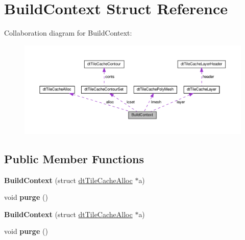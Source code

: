 \hypertarget{structBuildContext}{}\section{Build\+Context Struct Reference}
\label{structBuildContext}


Collaboration diagram for Build\+Context\+:
\nopagebreak
\begin{figure}[H]
\begin{center}
\leavevmode
\includegraphics[width=350pt]{structBuildContext__coll__graph}
\end{center}
\end{figure}
\subsection*{Public Member Functions}
\begin{DoxyCompactItemize}
\item 
\mbox{\label{structBuildContext_aa827e39c713a81b79a7c70fb600cac06}} 
{\bfseries Build\+Context} (struct \hyperlink{structdtTileCacheAlloc}{dt\+Tile\+Cache\+Alloc} $\ast$a)
\item 
\mbox{\label{structBuildContext_a7634c4e3c1846d1da0791508605b0bf4}} 
void {\bfseries purge} ()
\item 
\mbox{\label{structBuildContext_aa827e39c713a81b79a7c70fb600cac06}} 
{\bfseries Build\+Context} (struct \hyperlink{structdtTileCacheAlloc}{dt\+Tile\+Cache\+Alloc} $\ast$a)
\item 
\mbox{\label{structBuildContext_a7634c4e3c1846d1da0791508605b0bf4}} 
void {\bfseries purge} ()
\end{DoxyCompactItemize}
